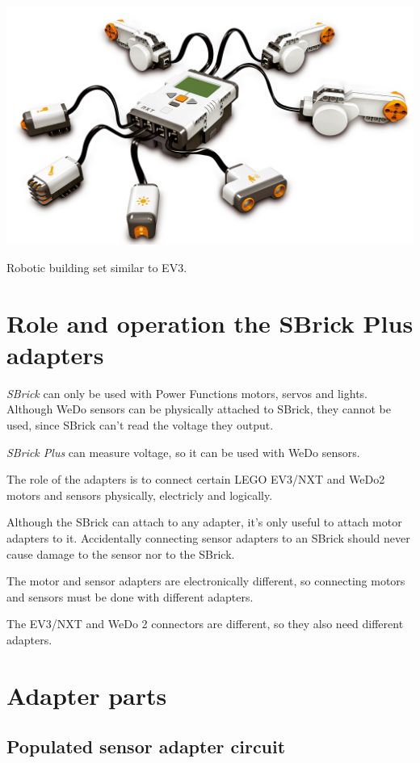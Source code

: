 \documentclass[a4paper,12pt]{article}
\begin{document}
\includegraphics[width=13.5cm]{lego-mindstorms-nxt.jpg}

Robotic building set similar to EV3.

\section{Role and operation the SBrick Plus adapters}

\emph{SBrick} can only be used with Power Functions motors, servos and lights.
Although WeDo sensors can be physically attached to SBrick, they cannot be
used, since SBrick can't read the voltage they output.

\emph{SBrick Plus} can measure voltage, so it can be used with WeDo sensors.

The role of the adapters is to connect certain LEGO EV3/NXT and WeDo2 motors
and sensors physically, electricly and logically.

Although the SBrick can attach to any adapter, it's only useful to attach motor
adapters to it. Accidentally connecting sensor adapters to an SBrick should
never cause damage to the sensor nor to the SBrick.

The motor and sensor adapters are electronically different, so connecting
motors and sensors must be done with different adapters.

The EV3/NXT and WeDo 2 connectors are different, so they also need different
adapters.

\section{Adapter parts}

\subsection{Populated sensor adapter circuit}
\end{document}
